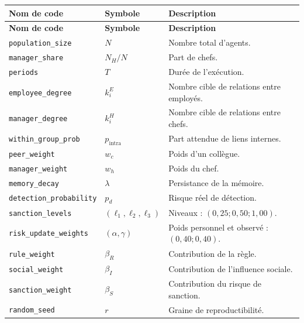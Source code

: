 \documentclass[11pt,a4paper]{article}
\newcommand{\code}[1]{\texttt{\small #1}}
\begin{document}
\begin{longtable}{L{29mm}L{45mm}L{64mm}}
\toprule
{}
\color{white}\textbf{Nom de code} &
\color{white}\textbf{Symbole} &
\color{white}\textbf{Description}\\
\midrule
\endfirsthead
\toprule
{}
\color{white}\textbf{Nom de code} &
\color{white}\textbf{Symbole} &
\color{white}\textbf{Description}\\
\midrule
\endhead
\code{population\_size} & $N$ & Nombre total d’agents.\\
\code{manager\_share} & $N_H/N$ & Part de chefs.\\
\code{periods} & $T$ & Durée de l’exécution.\\
\code{employee\_degree} & $k_i^E$ & Nombre cible de relations entre employés.\\
\code{manager\_degree} & $k_i^H$ & Nombre cible de relations entre chefs.\\
\code{within\_group\_prob} & $p_{\mathrm{intra}}$ & Part attendue de liens internes.\\
\code{peer\_weight} & $w_c$ & Poids d’un collègue.\\
\code{manager\_weight} & $w_h$ & Poids du chef.\\
\code{memory\_decay} & $\lambda$ & Persistance de la mémoire.\\
\code{detection\_}\newline\code{probability} & $p_d$ & Risque réel de détection.\\
\code{sanction\_levels} & $(\ell_1,\ell_2,\ell_3)$ &
Niveaux : $(0{,}25;0{,}50;1{,}00)$.\\
\code{risk\_update\_}\newline\code{weights} & $(\alpha,\gamma)$ &
Poids personnel et observé : $(0{,}40;0{,}40)$.\\
\code{rule\_weight} & $\beta_R$ & Contribution de la règle.\\
\code{social\_weight} & $\beta_I$ & Contribution de l’influence sociale.\\
\code{sanction\_weight} & $\beta_S$ & Contribution du risque de sanction.\\
\code{random\_seed} & $r$ & Graine de reproductibilité.\\
\bottomrule
\end{longtable}
\end{document}
